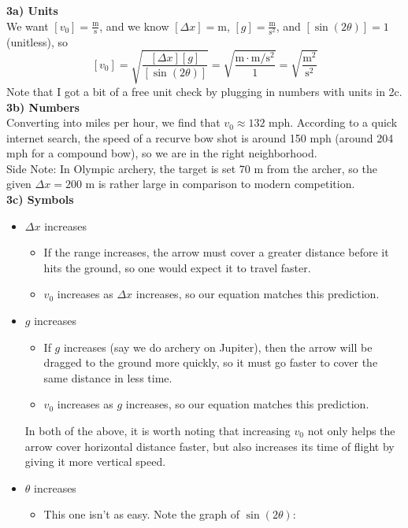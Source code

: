\documentclass[]{article}
\begin{document}
\begin{TeacherMargin}
\noindent\textbf{3a) Units} \\
We want $[v_{0}] = \frac{\text{m}}{\text{s}}$, and we know $[\Delta x]=\text{m}$, $[g]=\frac{\text{m}}{\text{s}^{2}}$, and $[\sin(2\theta)]=1$ (unitless), so
\[
[v_{0}] = \sqrt{\frac{[\Delta x][g]}{[\sin(2\theta)]}} = \sqrt{\frac{\text{m}\cdot\text{m}/\text{s}^{2}}{1}} = \sqrt{\frac{\text{m}^{2}}{\text{s}^{2}}}
\]
Note that I got a bit of a free unit check by plugging in numbers with units in 2c. \\
\textbf{3b) Numbers} \\
Converting into miles per hour, we find that $v_{0} \approx 132$ mph. According to a quick internet search, the speed of a recurve bow shot is around 150 mph (around 204 mph for a compound bow), so we are in the right neighborhood. \\
Side Note: In Olympic archery, the target is set 70 m from the archer, so the given $\Delta x = 200$ m is rather large in comparison to modern competition. \\
\textbf{3c) Symbols}
\begin{itemize}
	\item $\Delta x$ increases
	\begin{itemize}
		\item If the range increases, the arrow must cover a greater distance before it hits the ground, so one would expect it to travel faster.
		\item $v_{0}$ increases as $\Delta x$ increases, so our equation matches this prediction.
	\end{itemize}
	\item $g$ increases
	\begin{itemize}
		\item If $g$ increases (say we do archery on Jupiter), then the arrow will be dragged to the ground more quickly, so it must go faster to cover the same distance in less time.
		\item $v_{0}$ increases as $g$ increases, so our equation matches this prediction.
	\end{itemize}
	In both of the above, it is worth noting that increasing $v_{0}$ not only helps the arrow cover horizontal distance faster, but also increases its time of flight by giving it more vertical speed.
	\item $\theta$ increases
	\begin{itemize}
		\item This one isn't as easy. Note the graph of $\sin(2\theta)$:

\end{itemize}
\end{itemize}
\end{TeacherMargin}
\end{document}
